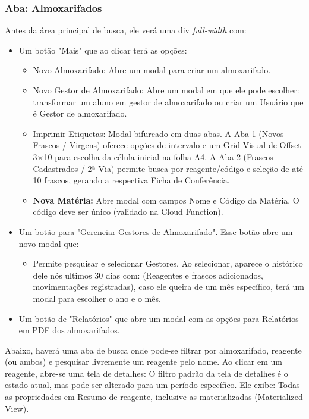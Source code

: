 \subsubsection{Aba: Almoxarifados}
Antes da área principal de busca, ele verá uma div \textit{full-width} com:
\begin{itemize}
    \item Um botão "Mais" que ao clicar terá as opções:
     \begin{itemize}
         \item Novo Almoxarifado: Abre um modal para criar um almoxarifado.
         \item Novo Gestor de Almoxarifado: Abre um modal em que ele pode escolher: transformar um aluno em gestor de almoxarifado ou criar um Usuário que é Gestor de almoxarifado.
         \item Imprimir Etiquetas: Modal bifurcado em duas abas. A Aba 1 (Novos Frascos / Virgens) oferece opções de intervalo e um Grid Visual de Offset 3×10 para escolha da célula inicial na folha A4. A Aba 2 (Frascos Cadastrados / 2ª Via) permite busca por reagente/código e seleção de até 10 frascos, gerando a respectiva Ficha de Conferência.
         \item \textbf{Nova Matéria:} Abre modal com campos Nome e Código da Matéria. O código deve ser único (validado na Cloud Function).
     \end{itemize}
    \item Um botão para "Gerenciar Gestores de Almoxarifado". Esse botão abre um novo modal que:
    \begin{itemize}
        \item Permite pesquisar e selecionar Gestores. Ao selecionar, aparece o histórico dele nós ultimos 30 dias com: (Reagentes e frascos adicionados, movimentações registradas), caso ele queira de um mês específico, terá um modal para escolher o ano e o mês.
    \end{itemize}
    \item Um botão de "Relatórios" que abre um modal com as opções para Relatórios em PDF dos almoxarifados.
\end{itemize}
Abaixo, haverá uma aba de busca onde pode-se filtrar por almoxarifado, reagente (ou ambos) e pesquisar livremente um reagente pelo nome. Ao clicar em um reagente, abre-se uma tela de detalhes:
O filtro padrão da tela de detalhes é o estado atual, mas pode ser alterado para um período específico. Ele exibe: Todas as propriedades em Resumo de reagente, inclusive as materializadas (Materialized View).

